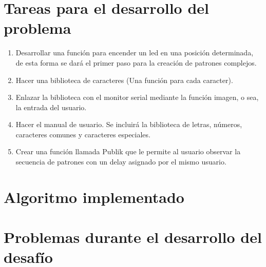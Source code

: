 \documentclass{article}
\begin{document}
\section{Tareas para el desarrollo del problema} \label{imagenes}
\begin{enumerate}
  \item Desarrollar una función para encender un led en una posición determinada, de esta forma se dará el primer paso para la creación de patrones complejos.
  \item Hacer una biblioteca de caracteres (Una función para cada caracter).
  \item Enlazar la biblioteca con el monitor serial mediante la función imagen, o sea, la entrada del usuario.
  \item Hacer el manual de usuario. Se incluirá la biblioteca de letras, números, caracteres comunes y caracteres especiales.
  \item Crear una función llamada Publik que le permite al usuario observar la secuencia de patrones con un delay asignado por el mismo usuario.
\end{enumerate}


\section{Algoritmo implementado} \label{imagenes}
\section{Problemas durante el desarrollo del desafío} \label{imagenes}
\end{document}
